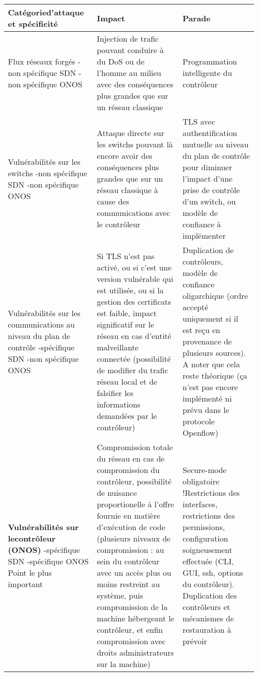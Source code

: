 \begin{small}

\begin{longtable}{| p{} | p{} | p{}|}

\hline
\textbf{Catégorie\newline d'attaque et spécificité} & \textbf{Impact} & \textbf{Parade} \\
\hline
Flux réseaux forgés \newline -non spécifique SDN \newline -non spécifique ONOS & Injection de trafic pouvant conduire à du DoS ou de l'homme au milieu avec des conséquences plus grandes que sur un réseau classique & Programmation intelligente du contrôleur\\ 
\hline
Vulnérabilités sur les \newline switchs \newline -non spécifique SDN \newline -non spécifique ONOS & Attaque directe sur les switchs pouvant là encore avoir des conséquences plus grandes que sur un réseau classique à cause des communications avec le contrôleur & TLS avec authentification mutuelle au niveau du plan de contrôle pour diminuer l'impact d'une prise de contrôle d'un switch, ou modèle de confiance à implémenter\\ 
\hline
Vulnérabilités sur les communications au niveau du plan de contrôle \newline -spécifique SDN \newline -non spécifique ONOS &  Si TLS n'est pas activé, ou si c'est une version vulnérable qui est utilisée, ou si la gestion des certificats est faible, impact significatif sur le réseau en cas d'entité malveillante connectée (possibilité de modifier du trafic réseau local et de falsifier les informations demandées par le contrôleur) & Duplication de contrôleurs, modèle de confiance oligarchique (ordre accepté uniquement si il est reçu en provenance de plusieurs sources). A noter que cela reste théorique (ça n'est pas encore implémenté ni prévu dans le protocole Openflow)\\ 
\hline
\textbf{Vulnérabilités sur le\newline contrôleur (ONOS)} \newline -spécifique SDN \newline -spécifique ONOS \newline Point le plus important & Compromission totale du réseau en cas de compromission du contrôleur, possibilité de nuisance proportionelle à l'offre fournie en matière d'exécution de code (plusieurs niveaux de compromission : au sein du contrôleur avec un accès plus ou moins restreint au système, puis compromission de la machine hébergeant le contrôleur, et enfin compromission avec droits administrateurs sur la machine)  & Secure-mode obligatoire !\newline Restrictions des interfaces, restrictions des permissions, configuration soigneusement effectuée (CLI, GUI, ssh, options du contrôleur). Duplication des contrôleurs et mécanismes de restauration à prévoir\\ 

\end{longtable}
\end{small}
